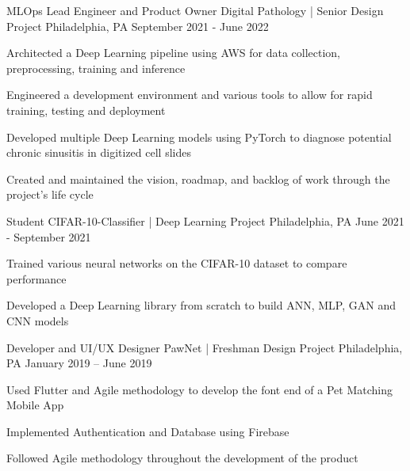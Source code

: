 
\begin{cventries}

	\cventry
	{MLOps Lead Engineer and Product Owner}
	{Digital Pathology | {\color{gray} Senior Design Project}}
	{Philadelphia, PA}
	{September 2021 - June 2022}
	{\begin{cvitems}
		\item {Architected a Deep Learning pipeline using AWS for data collection, preprocessing, training and inference}
		\item {Engineered a development environment and various tools to allow for rapid training, testing and deployment}
		\item {Developed multiple Deep Learning models using PyTorch to diagnose potential chronic sinusitis in digitized cell slides}
		\item {Created and maintained the vision, roadmap, and backlog of work through the project's life cycle}
	\end{cvitems}}

	\cventry
	{Student}
	{CIFAR-10-Classifier | {\color{gray} Deep Learning Project}}
	{Philadelphia, PA}
	{June 2021 - September 2021}
	{\begin{cvitems}
		\item {Trained various neural networks on the CIFAR-10 dataset to compare performance}
		\item {Developed a Deep Learning library from scratch to build ANN, MLP, GAN and CNN models}
	\end{cvitems}}

	\cventry
	{Developer and UI/UX Designer}
	{PawNet | {\color{gray} Freshman Design Project}}
	{Philadelphia, PA}
	{January 2019 – June 2019}
	{\begin{cvitems}
		\item {Used Flutter and Agile methodology to develop the font end of a Pet Matching Mobile App}
		\item {Implemented Authentication and Database using Firebase}
		\item {Followed Agile methodology throughout the development of the product}
		\end{cvitems}}

\end{cventries}